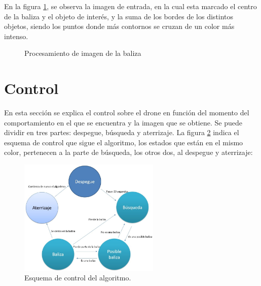 \hspace{1 cm} En la figura \ref{f:ColorFilterTotal}, se observa la imagen de entrada, en la cual esta marcado el centro de la baliza y el objeto de inter\'es, y la suma de los bordes de los distintos objetos, siendo los puntos donde m\'as contornos se cruzan de un color m\'as intenso. 

\begin{figure}[H]
 \centering
 \caption{Procesamiento de imagen de la baliza}
 \label{f:ColorFilterTotal}
\end{figure} 



\section{Control}
\label{sec.control}

\hspace{1 cm} En esta secci\'on se explica el control sobre el drone en funci\'on del momento del comportamiento en el que se encuentra y la imagen que se obtiene. Se puede dividir en tres partes:
despegue, b\'usqueda y aterrizaje. La figura \ref{fig:Esquema_control2} indica el esquema de control que sigue el algoritmo, los estados que est\'an en el mismo color, pertenecen a la parte de b\'usqueda, los otros dos, al despegue y aterrizaje:

\begin{figure}[H]
	\centering
		\includegraphics[width=0.6\textwidth]{imgs/NuevoAlgoritmo.jpg}
        \caption{Esquema de control del algoritmo.}
	\label{fig:Esquema_control2}
\end{figure}


